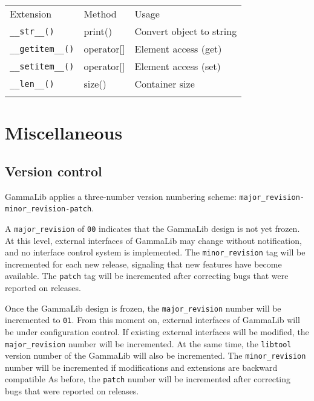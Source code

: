\documentclass{article}[12pt,a4]
\begin{document}
\begin{center}
\begin{tabular}{lll}
\hline
\hline
\noalign{\smallskip}
Extension & Method & Usage \\
\noalign{\smallskip}
\hline
\noalign{\smallskip}
{\tt \_\_str\_\_()} & print() & Convert object to string \\
{\tt \_\_getitem\_\_()} & operator[] & Element access (get) \\
{\tt \_\_setitem\_\_()} & operator[] & Element access (set) \\
{\tt \_\_len\_\_()} & size() & Container size \\
\noalign{\smallskip}
\hline
\end{tabular}
\end{center}



\section{Miscellaneous}

\subsection{Version control}

GammaLib applies a three-number version numbering scheme:
{\tt major\_revision-minor\_revision-patch}.

A {\tt major\_revision} of {\tt 00} indicates that the GammaLib design is not yet frozen.
At this level, external interfaces of GammaLib may change without notification, and no
interface control system is implemented.
The {\tt minor\_revision} tag will be incremented for each new release, signaling
that new features have become available.
The {\tt patch} tag will be incremented after correcting bugs that were reported
on releases.

Once the GammaLib design is frozen, the {\tt major\_revision} number will be incremented 
to {\tt 01}.
From this moment on, external interfaces of GammaLib will be under configuration control.
If existing external interfaces will be modified, the {\tt major\_revision} number will be
incremented.
At the same time, the {\tt libtool} version number of the GammaLib will also be incremented.
The {\tt minor\_revision} number will be incremented if modifications and extensions
are backward compatible
As before, the {\tt patch} number will be incremented after correcting bugs that were 
reported on releases.
\end{document}
